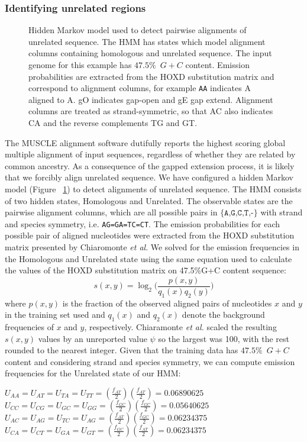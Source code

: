 \documentclass{llncs}
\begin{document}
\subsubsection{Identifying unrelated regions}
\begin{figure}[t]
\centering {}
\caption{Hidden Markov model used to detect pairwise alignments of unrelated
sequence. The HMM has states which model alignment columns containing
homologous and unrelated sequence. The input genome for this example has $47.5\%$~$G+C$ content. Emission probabilities are extracted from the HOXD substitution matrix and correspond to alignment
columns, for example \texttt{AA} indicates A aligned to A.  gO
indicates gap-open and gE gap extend. Alignment columns are treated as
strand-symmetric, so that AC also indicates CA and the reverse
complements TG and GT.}
\label{fig-hmm}\vspace{-0.2cm}
\end{figure}
The MUSCLE alignment software dutifully reports the highest scoring
global multiple alignment of input sequences, regardless of whether
they are related by common ancestry. As a consequence of the gapped
extension process, it is likely that we forcibly align unrelated
sequence. We have configured a hidden Markov model (Figure
~\ref{fig-hmm}) to detect alignments of unrelated sequence. The HMM
consists of two hidden states, Homologous and Unrelated. The
observable states are the pairwise alignment columns, which are all
possible pairs in $\texttt{{\{A,G,C,T,-\}}}$ with strand and species
symmetry, i.e. \texttt{AG=GA=TC=CT}.  The emission probabilities for
each possible pair of aligned nucleotides were extracted from the HOXD
substitution matrix presented by Chiaromonte \textit{et al}\cite{hoxd}.
We solved for the emission frequencies in the
Homologous and Unrelated state using the same equation used to
calculate the values of the HOXD substitution matrix on 47.5\%G+C
content sequence\cite{hoxd}:
\begin{equation}
s(x,y)= \log_{2}{\Bigg(\frac{p(x,y)}{q_{1}(x)q_{2}(y)}\Bigg)}
\end{equation}
{w}here $p(x,y)$ is the fraction of the observed aligned pairs of
nucleotides $x$ and $y$ in the training set used and $q_{1}(x)$ and
$q_{2}(x)$ denote the background frequencies of $x$ and $y$,
respectively. Chiaramonte \textit{et al.} scaled the resulting
$s(x,y)$ values by an unreported value $\psi$ so the largest was 100,
with the rest rounded to the nearest integer.  Given that the training
data has $47.5\%$~$G+C$ content and considering strand and species
symmetry, we can compute emission frequencies for the Unrelated state
of our HMM:
\begin{center}$U_{AA}=U_{AT}=U_{TA}=U_{TT}=(\frac{f_{AT}}{2})(\frac{f_{AT}}{2})
= 0.06890625$ \\
$U_{CC}=U_{CG}=U_{GC}=U_{GG}=(\frac{f_{GC}}{2})(\frac{f_{GC}}{2}) =
0.05640625$ \\
$U_{AC}=U_{AG}=U_{TC}=U_{AG}=(\frac{f_{AT}}{2})(\frac{f_{GC}}{2}) =
0.06234375$ \\
$U_{CA}=U_{CT}=U_{GA}=U_{GT}=(\frac{f_{GC}}{2})(\frac{f_{AT}}{2}) =
0.06234375$ \\
\end{center}
\end{document}
